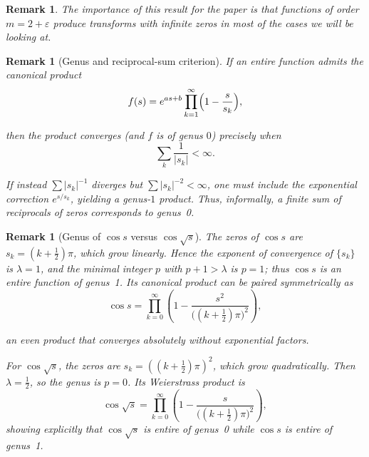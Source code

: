 \documentclass[11pt]{article}
\theoremstyle{breakdef}
\newtheorem{remark}[theorem]{Remark}
\begin{document}
\begin{remark}
The importance of this result for the paper is that functions of order $m=2+\varepsilon$ produce transforms with infinite zeros in most of the cases we will be looking at.
\end{remark}

\begin{remark}[Genus and reciprocal-sum criterion]
If an entire function admits the canonical product
\begin{equation}
f(s)=e^{a s+b}\prod_{k=1}^{\infty}\Bigl(1-\frac{s}{s_k}\Bigr),
\end{equation}

then the product converges (and $f$ is of genus $0$) precisely when
\begin{equation}
\sum_{k}\frac{1}{|s_k|}<\infty.
\end{equation}

If instead $\sum|s_k|^{-1}$ diverges but $\sum|s_k|^{-2}<\infty$, one must include the exponential correction
$e^{s/s_k}$, yielding a genus-$1$ product.
Thus, informally, \emph{a finite sum of reciprocals of zeros corresponds to genus~0.}
\end{remark}

\begin{remark}[Genus of $\cos s$ versus $\cos\!\sqrt{s}$]
The zeros of $\cos s$ are $s_k=(k+\tfrac12)\pi$, which grow linearly.
Hence the exponent of convergence of $\{s_k\}$ is $\lambda=1$, and
the minimal integer $p$ with $p+1>\lambda$ is $p=1$; thus
$\cos s$ is an entire function of genus~1.  Its canonical product can
be paired symmetrically as
\begin{equation}
\cos s
  = \prod_{k=0}^{\infty}
    \left(1-\frac{s^{2}}{\bigl((k+\tfrac12)\pi\bigr)^{2}}\right),
\end{equation}

an even product that converges absolutely without exponential factors.

For $\cos\!\sqrt{s}$, the zeros are
$s_k=((k+\tfrac12)\pi)^{2}$, which grow quadratically.
Then $\lambda=\tfrac12$, so the genus is $p=0$.
Its Weierstrass product is
\begin{equation}
\cos\!\sqrt{s}
  = \prod_{k=0}^{\infty}
    \left(1-\frac{s}{\bigl((k+\tfrac12)\pi\bigr)^{2}}\right),
\end{equation}
showing explicitly that $\cos\!\sqrt{s}$ is entire of genus~0
while $\cos s$ is entire of genus~1.
\end{remark}
\end{document}
